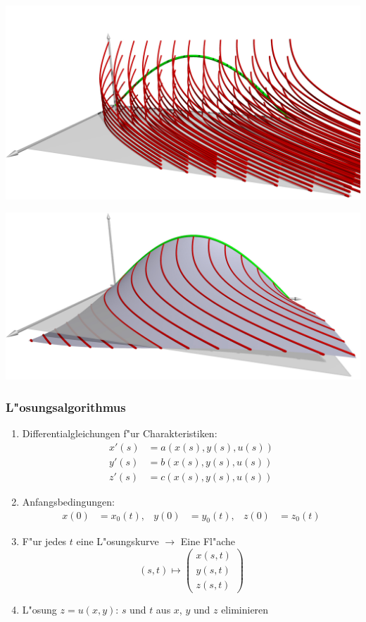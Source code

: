 \documentclass[handout]{beamer}
\begin{document}
\begin{frame}
\begin{center}
\includegraphics[width=\hsize]{../../skript/3d/chr.jpg}
\end{center}
\end{frame}

\begin{frame}
\begin{center}
\includegraphics[width=\hsize]{../../skript/3d/sol.jpg}
\end{center}
\end{frame}

\begin{frame}
\frametitle{L"osungsalgorithmus}
\begin{enumerate}
\item Differentialgleichungen f"ur Charakteristiken:
\pause
\begin{align*}
x'(s)&=a(x(s),y(s),u(s))\\
y'(s)&=b(x(s),y(s),u(s))\\
z'(s)&=c(x(s),y(s),u(s))
\end{align*}
\pause
\item Anfangsbedingungen:
\pause
\begin{align*}
x(0)&=x_0(t),&
y(0)&=y_0(t),&
z(0)&=z_0(t)
\end{align*}%
\pause
\item F"ur jedes $t$ eine L"osungskurve $\to$ Eine Fl"ache
\pause
\[
(s,t)\mapsto\begin{pmatrix}
x(s,t)\\
y(s,t)\\
z(s,t)
\end{pmatrix}
\]
\pause
\item L"osung $z=u(x,y)$:
\pause
$s$ und $t$ aus $x$, $y$ und $z$ eliminieren
\end{enumerate}
\end{frame}
\end{document}
